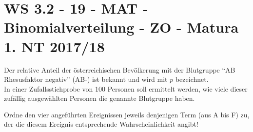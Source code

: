 \section{WS 3.2 - 19 - MAT - Binomialverteilung - ZO - Matura 1. NT 2017/18}

\begin{beispiel}[WS 3.2]{1}
Der relative Anteil der österreichischen Bevölkerung mit der Blutgruppe "`AB Rhesusfaktor negativ"' (AB-) ist bekannt und wird mit $p$ bezeichnet.\\
In einer Zufallsstichprobe von 100 Personen soll ermittelt werden, wie viele dieser zufällig ausgewählten Personen die genannte Blutgruppe haben.

Ordne den vier angeführten Ereignissen jeweils denjenigen Term (aus A bis F) zu, der die diesem Ereignis entsprechende Wahrscheinlichkeit angibt!

\end{beispiel}